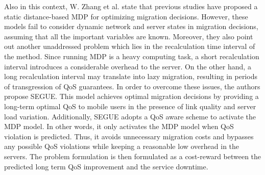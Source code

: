 \noindent\tab Also in this context, W. Zhang et al. \cite{zhang2016segue} state that previous studies have proposed a static distance-based MDP for optimizing migration decisions. However, these models fail to consider dynamic network and server states in migration decisions, assuming that all the important variables are known. Moreover, they also point out another unaddressed problem which lies in the recalculation time interval of the method. Since running MDP is a heavy computing task, a short recalculation interval introduces a considerable overhead to the server. On the other hand, a long recalculation interval may translate into lazy migration, resulting in periods of transgression of QoS guarantees. In order to overcome these issues, the authors propose SEGUE. This model achieves optimal migration decisions by providing a long-term optimal QoS to mobile users in the presence of link quality and server load variation. Additionally, SEGUE adopts a QoS aware scheme to activate the MDP model. In other words, it only activates the MDP model when QoS violation is predicted. Thus, it avoids unnecessary migration costs and bypasses any possible QoS violations while keeping a reasonable low overhead in the servers.
The problem formulation is then formulated as a cost-reward between the predicted long term QoS improvement and the service downtime.\\
